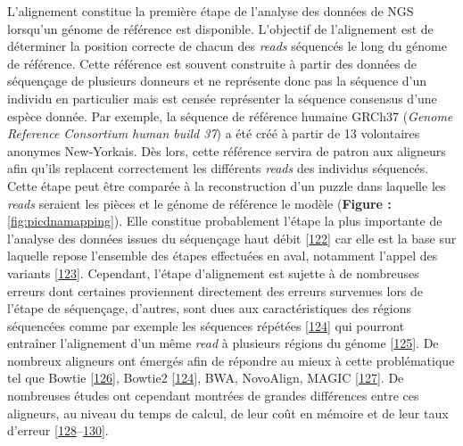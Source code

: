 \documentclass[12pt,twoside]{reedthesis}
\theoremstyle{definition}
\theoremstyle{definition}
\theoremstyle{remark}
\begin{document}
  L'alignement constitue la première étape de l'analyse des données de NGS
  lorsqu'un génome de référence est disponible. L'objectif de l'alignement
  est de déterminer la position correcte de chacun des \emph{reads}
  séquencés le long du génome de référence. Cette référence est souvent
  construite à partir des données de séquençage de plusieurs donneurs et
  ne représente donc pas la séquence d'un individu en particulier mais est
  censée représenter la séquence consensus d'une espèce donnée. Par
  exemple, la séquence de référence humaine GRCh37 (\emph{Genome Reference
  Consortium human build 37}) a été créé à partir de 13 volontaires
  anonymes New-Yorkais. Dès lors, cette référence servira de patron aux
  aligneurs afin qu'ils replacent correctement les différents \emph{reads}
  des individus séquencés. Cette étape peut être comparée à la
  reconstruction d'un puzzle dans laquelle les \emph{reads} seraient les
  pièces et le génome de référence le modèle (\textbf{Figure :
  }\ref{fig:picdnamapping}). Elle constitue probablement l'étape la plus
  importante de l'analyse des données issues du séquençage haut débit
  {[}\protect\hyperlink{ref-Flicek2009}{122}{]} car elle est la base sur
  laquelle repose l'ensemble des étapes effectuées en aval, notamment
  l'appel des variants {[}\protect\hyperlink{ref-Nielsen2011}{123}{]}.
  Cependant, l'étape d'alignement est sujette à de nombreuses erreurs dont
  certaines proviennent directement des erreurs survenues lors de l'étape
  de séquençage, d'autres, sont dues aux caractéristiques des régions
  séquencées comme par exemple les séquences répétées
  {[}\protect\hyperlink{ref-Langmead2012}{124}{]} qui pourront entraîner
  l'alignement d'un même \emph{read} à plusieurs régions du génome
  {[}\protect\hyperlink{ref-Treangen2013}{125}{]}. De nombreux aligneurs
  ont émergés afin de répondre au mieux à cette problématique tel que
  Bowtie {[}\protect\hyperlink{ref-Langmead2009}{126}{]}, Bowtie2
  {[}\protect\hyperlink{ref-Langmead2012}{124}{]}, BWA, NovoAlign, MAGIC
  {[}\protect\hyperlink{ref-Su2014}{127}{]}. De nombreuses études ont
  cependant montrées de grandes différences entre ces aligneurs, au niveau
  du temps de calcul, de leur coût en mémoire et de leur taux d'erreur
  {[}\protect\hyperlink{ref-Ruffalo2011}{128}--\protect\hyperlink{ref-Bao2011}{130}{]}.
  
  \newpage
  
\end{document}
